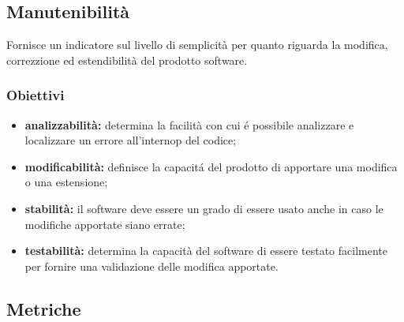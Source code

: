 \subsection{Manutenibilità}
Fornisce un indicatore sul livello di semplicità per quanto riguarda la modifica, correzzione ed estendibilità del prodotto software.
	\subsubsection{Obiettivi}
		\begin{itemize}
			\item \textbf{analizzabilità:} determina la facilità con cui é possibile analizzare e localizzare un errore all'internop del codice;
			\item \textbf{modificabilità:} definisce la capacitá del prodotto di apportare una modifica o una estensione;
			\item \textbf{stabilità:} il software deve essere un grado di essere usato anche in caso le modifiche apportate siano errate;
			\item \textbf{testabilità:} determina la capacità del software di essere testato facilmente per fornire una validazione delle modifica apportate.
		\end{itemize}
	\subsection{Metriche}
